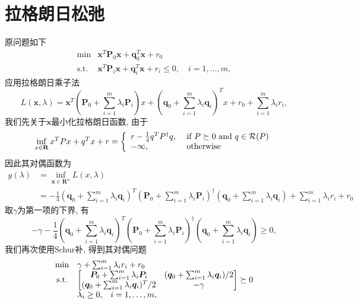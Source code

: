 \documentclass{article}
\begin{document}
\section{拉格朗日松弛}
原问题如下
\begin{equation} 
\begin{array}{cl}
{\min}  & {\bm{x}^T \bm{P}_0 \bm{x} + \bm{q}_0^T \bm{x} + r_0} \\
{\text{s.t.}} & {\bm{x}^T \bm{P}_i \bm{x} + \bm{q}_i^T \bm{x} + r_i \leq 0, \quad i = 1,\dots,m},
\end{array}
\end{equation}
应用拉格朗日乘子法
\begin{equation}
L (\bm{x},\lambda) = \bm{x} ^ {T} \left(\bm{P}_{0} + \sum_{i=1}^{m} \lambda_{i} \bm{P}_{i} \right) x + \left(\bm{q}_{0} + \sum _ {i=1}^{m} \lambda_{i} \bm{q}_{i} \right)^{T}x + r_{0} + \sum_{i=1}^{m} \lambda_{i} r_{i},
\end{equation}
我们先关于$\bm{x}$最小化拉格朗日函数, 由于
\begin{equation}
\inf _ { x \in \mathbf { R } } x ^ { T } P x + q ^ { T } x + r = \left\{ \begin{array} { l l } { r - \frac { 1 } { 4 } q ^ { T } P ^ { \dagger } q , } & { \text { if } P \succeq 0 \text { and } q \in \mathcal { R } ( P ) } \\ { - \infty , } & { \text { otherwise } } \end{array} \right.
\end{equation}
因此其对偶函数为
\begin{equation}
\begin{aligned} 
g (\lambda) & = \inf_{\bm{x} \in \mathbf {R}^{n}} L (x,\lambda) \\ & = - \frac {1} {4} \left( \bm{q}_{0} + \sum_{i=1}^{m} \lambda_{i} \bm{q}_{i} \right)^{T} \left(\bm{P}_{0} + \sum_{i=1}^{m } \lambda_{i} \bm{P}_{i} \right)^{\dagger} \left(\bm{q}_{0} + \sum_{i=1}^{m} \lambda_{i} \bm{q}_{i} \right) + \sum_{i=1}^{m} \lambda_{i}r_{i} + r_{0} 
\end{aligned}
\end{equation}
取$\gamma$为第一项的下界, 有
\begin{equation}
-\gamma - \frac {1} {4} \left( \bm{q}_{0} + \sum_{i=1}^{m} \lambda_{i} \bm{q}_{i} \right)^{T} \left(\bm{P}_{0} + \sum_{i=1}^{m } \lambda_{i} \bm{P}_{i} \right)^{\dagger} \left(\bm{q}_{0} + \sum_{i=1}^{m} \lambda_{i} \bm{q}_{i} \right) \ge 0,
\end{equation}
我们再次使用Schur补, 得到其对偶问题
\begin{equation}
\begin{array} { c l } 
{\min} & { \gamma + \sum_{i=1}^{m} \lambda_{i} r_{i} + r_{0} } \\ 
{\text {s.t.}} & 
{\begin{bmatrix} 
{\bm{P}_0 + \sum_{i=1}^m \lambda_i \bm{P}_i} & {(\bm{q}_0 + \sum_{i=1}^m \lambda_i \bm{q}_i)/2} \\
{(\bm{q}_0 + \sum_{i=1}^m \lambda_i \bm{q}_i)^T/2} & {-\gamma}
\end{bmatrix} \succeq 0} \\ 
{} & {\lambda_{i} \geq 0,} {\quad i=1, \ldots ,m}, 
\end{array}
\end{equation}
\end{document}
